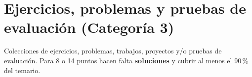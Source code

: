 \chapter{Ejercicios, problemas y pruebas de evaluación (Categoría 3)}

\begin{introcategoria}
Colecciones de ejercicios, problemas, trabajos, proyectos y/o pruebas de evaluación.
Para 8 o 14 puntos hacen falta \textbf{soluciones} y cubrir al menos el 90\,\% del temario.
\end{introcategoria}

